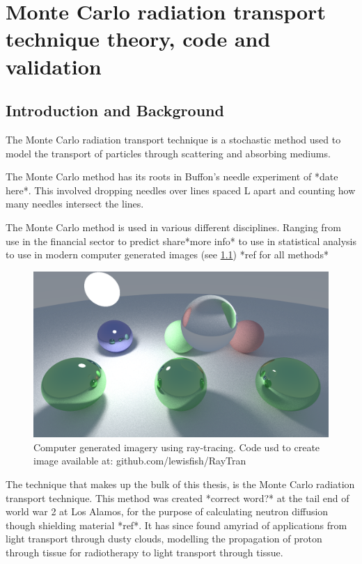 \chapter{Monte Carlo radiation transport technique theory, code and validation}

\section{Introduction and Background}
The Monte Carlo radiation transport technique is a stochastic method used to model the transport of particles through scattering and absorbing mediums. 

The Monte Carlo method has its roots in Buffon's needle experiment of *date here*. This involved dropping needles over lines spaced L apart and counting how many needles intersect the lines.


The Monte Carlo method is used in various different disciplines. Ranging from use in the financial sector to predict share*more info* to use in statistical analysis to use in modern computer generated images (see \cref{fig:ray-trace}) *ref for all methods*

\begin{figure}
\centering
\includegraphics[width=\columnwidth]{./MCRT/images/ray-tracing.png}
\caption{Computer generated imagery using ray-tracing. Code usd to create image available at: github.com/lewisfish/RayTran}
\label{fig:ray-trace}
\end{figure}

The technique that makes up the bulk of this thesis, is the Monte Carlo radiation transport technique. This method was created *correct word?* at the tail end of world war 2 at Los Alamos, for the purpose of calculating neutron diffusion though shielding material *ref*. It has since found amyriad of applications from light transport through dusty clouds, modelling the propagation of proton through tissue for radiotherapy to light transport through tissue.